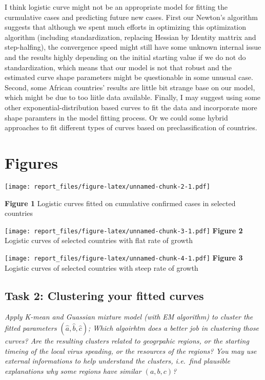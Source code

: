 \documentclass[
]{article}
\begin{document}
I think logistic curve might not be an appropriate model for fitting the
curmulative cases and predicting future new cases. First our Newton's
algorithm suggests that although we spent much efforts in optimizing
this optimization algorithm (including standardization, replacing
Hessian by Identity mattrix and step-halfing), the convergence speed
might still have some unknown internal issue and the results highly
depending on the initial starting value if we do not do standardization,
which means that our model is not that robust and the estimated curve
shape parameters might be questionable in some unusual case. Second,
some African countries' results are little bit strange base on our
model, which might be due to too liitle data available. Finally, I may
suggest using some other exponential-distribution based curves to fit
the data and incorporate more shape paramters in the model fitting
process. Or we could some hybrid approaches to fit different types of
curves based on preclassification of countries.

\newpage

\hypertarget{figures}{%
\section{Figures}\label{figures}}

\texttt{[image: report\_files/figure-latex/unnamed-chunk-2-1.pdf]}

\center \textbf{Figure 1} Logistic curves fitted on cumulative confirmed
cases in selected countries \center

\newpage

\texttt{[image: report\_files/figure-latex/unnamed-chunk-3-1.pdf]}
\center \textbf{Figure 2} Logistic curves of selected countries with
flat rate of growth \center \newpage

\texttt{[image: report\_files/figure-latex/unnamed-chunk-4-1.pdf]}
\center \textbf{Figure 3} Logistic curves of selected countries with
steep rate of growth \center \newpage

\hypertarget{task-2-clustering-your-fitted-curves}{%
\subsection{Task 2: Clustering your fitted
curves}\label{task-2-clustering-your-fitted-curves}}

\emph{Apply K-mean and Guassian mixture model (with EM algorithm) to
cluster the fitted parameters \((\hat{a},\hat{b},\hat{c})\); Which
algoirhtm does a better job in clustering those curves? Are the
resulting clusters related to geogrpahic regions, or the starting
timeing of the local virus speading, or the resources of the regions?
You may use external informations to help understand the clusters,
i.e.~find plausible explanations why some regions have similar
\((a, b,c)\)?}
\end{document}

